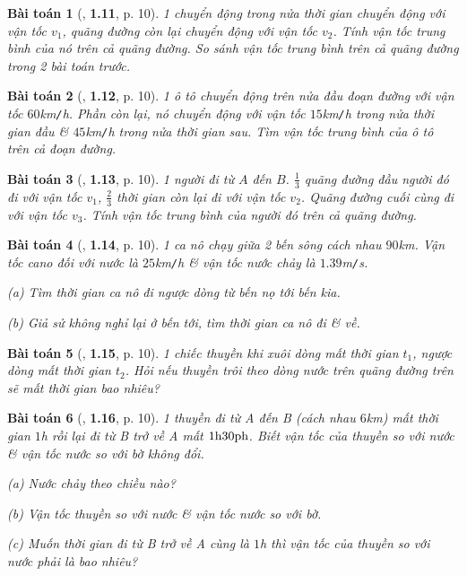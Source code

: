 \documentclass{article}
\numberwithin{equation}{section}
\newtheorem{baitoan}{Bài toán}[section]
\begin{document}
\begin{baitoan}[\cite{Van2022}, \textbf{1.11}, p. 10]
	1 chuyển động trong nửa thời gian chuyển động với vận tốc $v_1$, quãng đường còn lại chuyển động với vận tốc $v_2$. Tính vận tốc trung bình của nó trên cả quãng đường. So sánh vận tốc trung bình trên cả quãng đường trong 2 bài toán trước.
\end{baitoan}

\begin{baitoan}[\cite{Van2022}, \textbf{1.12}, p. 10]
	1 ô tô chuyển động trên nửa đầu đoạn đường với vận tốc $60$\emph{km\texttt{/}h}. Phần còn lại, nó chuyển động với vận tốc $15$\emph{km\texttt{/}h} trong nửa thời gian đầu \& $45$\emph{km\texttt{/}h} trong nửa thời gian sau. Tìm vận tốc trung bình của ô tô trên cả đoạn đường.
\end{baitoan}

\begin{baitoan}[\cite{Van2022}, \textbf{1.13}, p. 10]
	1 người đi từ $A$ đến $B$. $\frac{1}{3}$ quãng đường đầu người đó đi với vận tốc $v_1$, $\frac{2}{3}$ thời gian còn lại đi với vận tốc $v_2$. Quãng đường cuối cùng đi với vận tốc $v_3$. Tính vận tốc trung bình của người đó trên cả quãng đường.
\end{baitoan}

\begin{baitoan}[\cite{Van2022}, \textbf{1.14}, p. 10]
	1 ca nô chạy giữa 2 bến sông cách nhau $90$\emph{km}. Vận tốc cano đối với nước là $25$\emph{km\texttt{/}h} \& vận tốc nước chảy là $1.39$\emph{m\texttt{/}s}.
	\begin{enumerate*}
		\item[(a)] Tìm thời gian ca nô đi ngược dòng từ bến nọ tới bến kia.
		\item[(b)] Giả sử không nghỉ lại ở bến tới, tìm thời gian ca nô đi \& về.
	\end{enumerate*}
\end{baitoan}

\begin{baitoan}[\cite{Van2022}, \textbf{1.15}, p. 10]
	1 chiếc thuyền khi xuôi dòng mất thời gian $t_1$, ngược dòng mất thời gian $t_2$. Hỏi nếu thuyền trôi theo dòng nước trên quãng đường trên sẽ mất thời gian bao nhiêu?
\end{baitoan}

\begin{baitoan}[\cite{Van2022}, \textbf{1.16}, p. 10]
	1 thuyền đi từ A đến B (cách nhau $6$\emph{km}) mất thời gian $1$\emph{h} rồi lại đi từ B trở về A mất $\rm 1h30ph$. Biết vận tốc của thuyền so với nước \& vận tốc nước so với bờ không đổi.
	\begin{enumerate*}
		\item[(a)] Nước chảy theo chiều nào?
		\item[(b)] Vận tốc thuyền so với nước \& vận tốc nước so với bờ.
		\item[(c)] Muốn thời gian đi từ B trở về A cùng là $1$\emph{h} thì vận tốc của thuyền so với nước phải là bao nhiêu?
	\end{enumerate*}
\end{baitoan}
\end{document}
